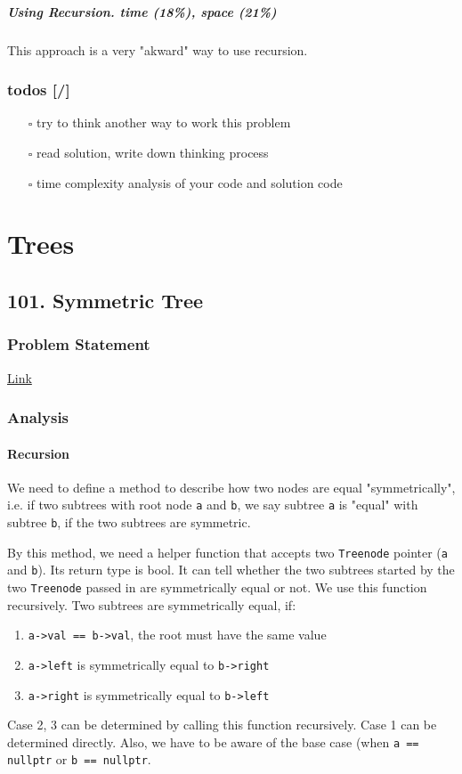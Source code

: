 \documentclass[12pt]{book}
\begin{document}
\subsubsection{Using Recursion. time (18\%), space (21\%)}
\label{sec:orgd461b89}
This approach is a very "akward" way to use recursion.
\section{todos [/]}
\label{sec:org48cb773}
\begin{itemize}
\item[{$\square$}] try to think another way to work this problem
\item[{$\square$}] read solution, write down thinking process
\item[{$\square$}] time complexity analysis of your code and solution code
\end{itemize}
\part{Trees}
\label{sec:org48ccd39}
\chapter{101. Symmetric Tree}
\label{sec:orgdbd080b}
\section{Problem Statement}
\label{sec:orgf49549d}
\href{https://leetcode.com/problems/symmetric-tree/}{Link}
\section{Analysis}
\label{sec:org29b268b}
\subsection{Recursion}
\label{sec:orgc0d9302}
We need to define a method to describe how two nodes are equal "symmetrically", i.e. if two subtrees with root node \texttt{a} and \texttt{b}, we say subtree \texttt{a} is "equal" with subtree \texttt{b}, if the two subtrees are symmetric.

By this method, we need a helper function that accepts two \texttt{Treenode} pointer (\texttt{a} and \texttt{b}). Its return type is bool. It can tell whether the two subtrees started by the two \texttt{Treenode} passed in are symmetrically equal or not. We use this function recursively. Two subtrees are symmetrically equal, if:
\begin{enumerate}
\item \texttt{a->val == b->val}, the root must have the same value
\item \texttt{a->left} is symmetrically equal to \texttt{b->right}
\item \texttt{a->right} is symmetrically equal to \texttt{b->left}
\end{enumerate}
Case 2, 3 can be determined by calling this function recursively. Case 1 can be determined directly. Also, we have to be aware of the base case (when \texttt{a == nullptr} or \texttt{b == nullptr}.
\end{document}
